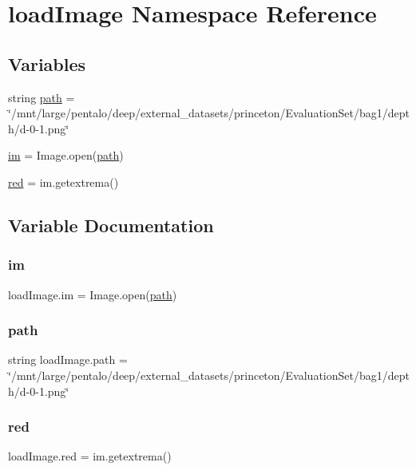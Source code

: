 \hypertarget{namespaceload_image}{}\section{load\+Image Namespace Reference}
\label{namespaceload_image}
\subsection*{Variables}
\begin{DoxyCompactItemize}
\item 
string \hyperlink{namespaceload_image_a2d12fe0487467ded88b6007624cbe6c7}{path} = \char`\"{}/mnt/large/pentalo/deep/external\+\_\+datasets/princeton/Evaluation\+Set/bag1/depth/d-\/0-\/1.png\char`\"{}
\item 
\hyperlink{namespaceload_image_a35a31d7c34c8aef3518b668b7c7b3cc1}{im} = Image.\+open(\hyperlink{namespaceload_image_a2d12fe0487467ded88b6007624cbe6c7}{path})
\item 
\hyperlink{namespaceload_image_a7db8b47946ece3163cc9ba0da721af88}{red} = im.\+getextrema()
\end{DoxyCompactItemize}


\subsection{Variable Documentation}
\mbox{\label{namespaceload_image_a35a31d7c34c8aef3518b668b7c7b3cc1}} 
\subsubsection{\texorpdfstring{im}{im}}
{\footnotesize\ttfamily load\+Image.\+im = Image.\+open(\hyperlink{namespaceload_image_a2d12fe0487467ded88b6007624cbe6c7}{path})}

\mbox{\label{namespaceload_image_a2d12fe0487467ded88b6007624cbe6c7}} 
\subsubsection{\texorpdfstring{path}{path}}
{\footnotesize\ttfamily string load\+Image.\+path = \char`\"{}/mnt/large/pentalo/deep/external\+\_\+datasets/princeton/Evaluation\+Set/bag1/depth/d-\/0-\/1.png\char`\"{}}

\mbox{\label{namespaceload_image_a7db8b47946ece3163cc9ba0da721af88}} 
\subsubsection{\texorpdfstring{red}{red}}
{\footnotesize\ttfamily load\+Image.\+red = im.\+getextrema()}

